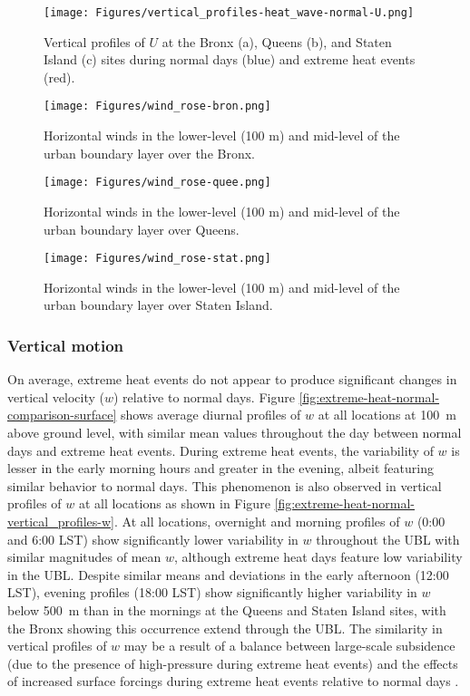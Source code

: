 \begin{figure}[ht]
	\centering
	\texttt{[image: Figures/vertical\_profiles-heat\_wave-normal-U.png]}
	\caption{Vertical profiles of $U$ at the Bronx (a), Queens (b), and Staten Island (c) sites during normal days (blue) and extreme heat events (red).}
	\label{fig:vertical_profiles-heat_wave-normal-U}
\end{figure}

\begin{figure}[ht]
	\texttt{[image: Figures/wind\_rose-bron.png]}
	\caption{Horizontal winds in the lower-level (100 m) and mid-level of the urban boundary layer over the Bronx.}
	\label{fig:wind_rose-bron}
\end{figure}
\begin{figure}[ht]
	\centering
	\texttt{[image: Figures/wind\_rose-quee.png]}
	\caption{Horizontal winds in the lower-level (100 m) and mid-level of the urban boundary layer over Queens.}
	\label{fig:wind_rose-quee}
\end{figure}
\begin{figure}[ht]
	\centering
	\texttt{[image: Figures/wind\_rose-stat.png]}
	\caption{Horizontal winds in the lower-level (100 m) and mid-level of the urban boundary layer over Staten Island.}
	\label{fig:wind_rose-stat}
\end{figure}

\FloatBarrier

\subsubsection{Vertical motion}
On average, extreme heat events do not appear to produce significant changes in vertical velocity ($w$) relative to normal days. Figure \ref{fig:extreme-heat-normal-comparison-surface} shows average diurnal profiles of $w$ at all locations at \SI{100}{\meter} above ground level, with similar mean values throughout the day between normal days and extreme heat events. During extreme heat events, the variability of $w$ is lesser in the early morning hours and greater in the evening, albeit featuring similar behavior to normal days. This phenomenon is also observed in vertical profiles of $w$ at all locations as shown in Figure \ref{fig:extreme-heat-normal-vertical_profiles-w}. At all locations, overnight and morning profiles of $w$ (0:00 and 6:00 LST) show significantly lower variability in $w$ throughout the UBL with similar magnitudes of mean $w$, although extreme heat days feature low variability in the UBL. Despite similar means and deviations in the early afternoon (12:00 LST), evening profiles (18:00 LST) show significantly higher variability in $w$ below \SI{500}{\meter} than in the mornings at the Queens and Staten Island sites, with the Bronx showing this occurrence extend through the UBL. The similarity in vertical profiles of $w$ may be a result of a balance between large-scale subsidence (due to the presence of high-pressure during extreme heat events) and the effects of increased surface forcings during extreme heat events relative to normal days \citep{dong2018, zhang2009}.

